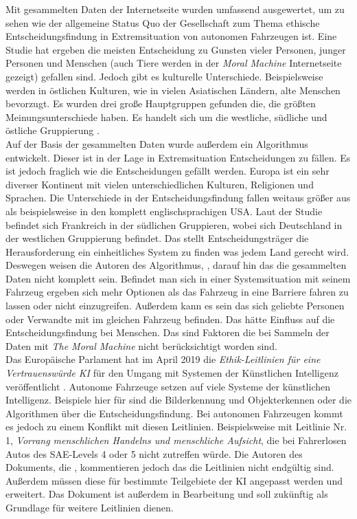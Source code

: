 Mit gesammelten Daten der Internetseite wurden umfassend ausgewertet, um zu sehen wie der allgemeine Status Quo der Gesellschaft zum Thema ethische Entscheidungsfindung in Extremsituation von autonomen Fahrzeugen ist. Eine Studie hat ergeben die meisten Entscheidung zu Gunsten vieler Personen, junger Personen und Menschen (auch Tiere werden in der \textit{Moral Machine} Internetseite gezeigt) gefallen sind. Jedoch gibt es kulturelle Unterschiede. Beispielsweise werden in östlichen Kulturen, wie in vielen Asiatischen Ländern, alte Menschen bevorzugt. Es wurden drei große Hauptgruppen gefunden die, die größten Meinungsunterschiede haben. Es handelt sich um die westliche, südliche und östliche Gruppierung \cite{moralMachine}.\\


Auf der Basis der gesammelten Daten wurde außerdem ein Algorithmus \cite{votingBasedSystem} entwickelt. Dieser ist in der Lage in Extremsituation Entscheidungen zu fällen. Es ist jedoch fraglich wie die Entscheidungen gefällt werden. Europa ist ein sehr diverser Kontinent mit vielen unterschiedlichen Kulturen, Religionen und Sprachen. Die Unterschiede in der Entscheidungsfindung fallen weitaus größer aus als beispielsweise in den komplett englischsprachigen USA. Laut der Studie befindet sich Frankreich in der südlichen Gruppieren, wobei sich Deutschland in der westlichen Gruppierung befindet. Das stellt Entscheidungsträger die Herausforderung ein einheitliches System zu finden was jedem Land gerecht wird.\\

Deswegen weisen die Autoren des Algorithmus, \citeauthor{votingBasedSystem}, darauf hin das die gesammelten Daten nicht komplett sein. Befindet man sich in einer Systemsituation mit seinem Fahrzeug ergeben sich mehr Optionen als das Fahrzeug in eine Barriere fahren zu lassen oder nicht einzugreifen. Außerdem kann es sein das sich geliebte Personen oder Verwandte mit im gleichen Fahrzeug befinden. Das hätte Einfluss auf die Entscheidungsfindung bei Menschen. Das sind Faktoren die bei Sammeln der Daten mit \textit{The Moral Machine} nicht berücksichtigt worden sind.\\

Das Europäische Parlament hat im April 2019 die \textit{Ethik-Leitlinien für eine Vertrauenswürde KI} für den Umgang mit Systemen der Künstlichen Intelligenz veröffentlicht \cite{ec2019ethics}. Autonome Fahrzeuge setzen auf viele Systeme der künstlichen Intelligenz. Beispiele hier für sind die Bilderkennung und Objekterkennen oder die Algorithmen über die Entscheidungsfindung. Bei autonomen Fahrzeugen kommt es jedoch zu einem Konflikt mit diesen Leitlinien. Beispielsweise mit Leitlinie Nr. 1, \textit{Vorrang menschlichen Handelns und menschliche Aufsicht}, die bei Fahrerlosen Autos des SAE-Levels 4 oder 5 nicht zutreffen würde. Die Autoren des Dokuments, die \citeauthor{ec2019ethics}, kommentieren jedoch das die Leitlinien nicht endgültig sind. Außerdem müssen diese für bestimmte Teilgebiete der KI angepasst werden und erweitert. Das Dokument ist außerdem in Bearbeitung und soll zukünftig als Grundlage für weitere Leitlinien dienen.\\